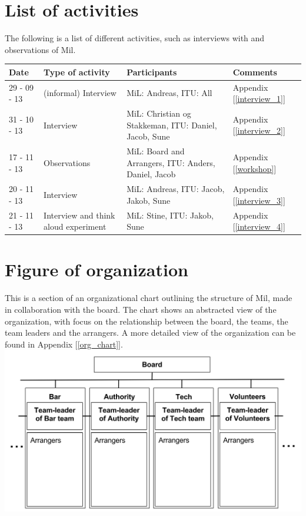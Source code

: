 \section{List of activities}
The following is a list of different activities, such as interviews with and observations of Mil.
\begin{center}
\begin{table}[H]
    \begin{tabular}{|p{3cm}|p{3cm}|p{3cm}|p{6cm}|}
    \hline
    \textbf{Date} & \textbf{Type of activity} & \textbf{Participants} & \textbf{Comments} \\ \hline
    29 - 09 - 13 & (informal) Interview & MiL: Andreas, ITU: All & Appendix  [\ref{interview_1}]\\ \hline
    31 - 10 - 13 & Interview & MiL: Christian og Stakkeman, ITU: Daniel, Jacob, Sune &  Appendix [\ref{interview_2}]  \\ \hline
    17 - 11 - 13 & Observations & MiL: Board and Arrangers, ITU: Anders, Daniel, Jacob & Appendix [\ref{workshop}] \\ \hline
    20 - 11 - 13 & Interview & MiL: Andreas, ITU: Jacob, Jakob, Sune & Appendix [\ref{interview_3}] \\ \hline
    21 - 11 - 13 & Interview and think aloud experiment & MiL: Stine, ITU: Jakob, Sune & Appendix [\ref{interview_4}] \\ \hline
    \end{tabular}
\end{table}
\end{center}

\section{Figure of organization}
\label{sec:organisation}
This is a section of an organizational chart outlining the structure of Mil, made in collaboration with the board. The chart shows an abstracted view of the organization, with focus on the relationship between the board, the teams, the team leaders and the arrangers. A more detailed view of the organization can be found in Appendix [\ref{org_chart}].\\
\includegraphics[scale=0.7]{Pictures/MIL_Organisational_chart_Abstract.png}

